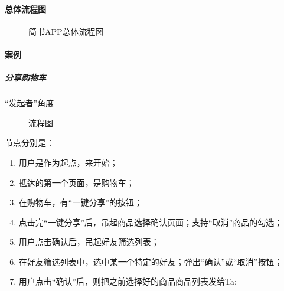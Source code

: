 \documentclass[letterpaper,10pt,english]{sphinxmanual}
\begin{document}
\paragraph{总体流程图}
\label{\detokenize{chapter_knowledge/flow_chart:id17}}
\begin{figure}[H]
\centering
\capstart

\noindent{}
\caption{简书APP总体流程图\sphinxfootnotemark[588]}\label{\detokenize{chapter_knowledge/flow_chart:id43}}\end{figure}
%
\begin{footnotetext}[588]\sphinxAtStartFootnote
{}
%
\end{footnotetext}\ignorespaces 

\paragraph{案例}
\label{\detokenize{chapter_knowledge/flow_chart:id18}}

\subparagraph{分享购物车}
\label{\detokenize{chapter_knowledge/flow_chart:id19}}
“发起者”角度

\begin{figure}[H]
\centering
\capstart

\noindent{}
\caption{流程图}\label{\detokenize{chapter_knowledge/flow_chart:id44}}\end{figure}

节点分别是：
%
\begin{footnote}[589]\sphinxAtStartFootnote
{}
%
\end{footnote}
\begin{enumerate}
%
\item {} 
用户是作为起点，来开始；

\item {} 
抵达的第一个页面，是购物车；

\item {} 
在购物车，有“一键分享”的按钮；

\item {} 
点击完“一键分享”后，吊起商品选择确认页面；支持“取消”商品的勾选；

\item {} 
用户点击确认后，吊起好友筛选列表；

\item {} 
在好友筛选列表中，选中某一个特定的好友；弹出“确认”或“取消”按钮；

\item {} 
用户点击“确认”后，则把之前选择好的商品商品列表发给Ta;

\end{enumerate}
\end{document}
